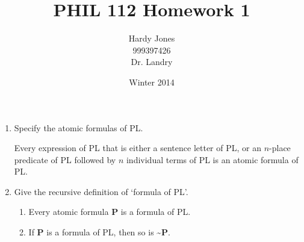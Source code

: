 \documentclass[12pt,letterpaper]{article}
\title{PHIL 112 Homework 1\vspace{-2ex}}
\author{Hardy Jones\\
        999397426\\
        Dr. Landry\vspace{-2ex}}
\date{Winter 2014}
\begin{document}
  \maketitle

  \begin{enumerate}
    \item
      Specify the atomic formulas of PL.

      Every expression of PL that is either a sentence letter of PL, or
      an $n$-place predicate of PL followed by $n$ individual terms of PL is an atomic formula of PL.

    \item
      Give the recursive definition of `formula of PL'.

      \begin{enumerate}
        \item Every atomic formula \textbf{P} is a formula of PL.
        \item If \textbf{P} is a formula of PL, then so is \textasciitilde \textbf{P}.
      \end{enumerate}
  \end{enumerate}
\end{document}
